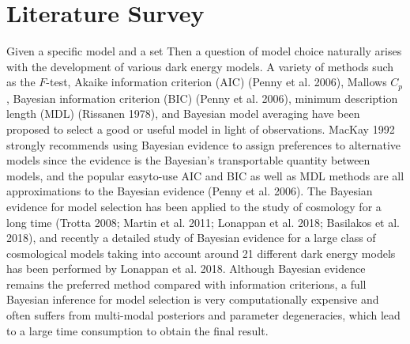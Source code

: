 \section{Literature Survey}
Given a specific model and a set Then a question of model choice naturally arises with the development of various dark energy models. A variety of methods such as the $F$-test, Akaike information criterion (AIC) (Penny et al. 2006), Mallows $C_{p}$, Bayesian information criterion (BIC) (Penny et al. 2006), minimum description length (MDL) (Rissanen 1978), and Bayesian model averaging have been proposed to select a good or useful model in light of observations. MacKay 1992 strongly recommends using Bayesian evidence to assign preferences to alternative models since the evidence is the Bayesian's transportable quantity between models, and the popular easyto-use AIC and BIC as well as MDL methods are all approximations to the Bayesian evidence (Penny et al. 2006). The Bayesian evidence for model selection has been applied to the study of cosmology for a long time (Trotta 2008; Martin et al. 2011; Lonappan et al. 2018; Basilakos et al. 2018), and recently a detailed study of Bayesian evidence for a large class of cosmological models taking into account around 21 different dark energy models has been performed by Lonappan et al. 2018. Although Bayesian evidence remains the preferred method compared with information criterions, a full Bayesian inference for model selection is very computationally expensive and often suffers from multi-modal posteriors and parameter degeneracies, which lead to a large time consumption to obtain the final result.